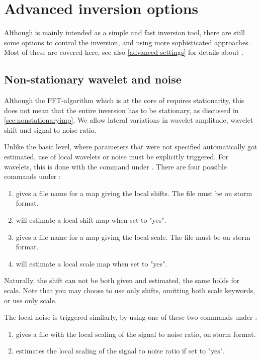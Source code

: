 \section{Advanced inversion options}
\label{sec:advinvusr}
Although \crava is mainly intended as a simple and fast inversion tool, there are still some options to control the inversion, and using more sophisticated approaches. Most of these are covered here, see also \autoref{advanced-settings} for details about .
\subsection{Non-stationary wavelet and noise}
Although the FFT-algorithm which is at the core of \crava requires stationarity, this does not mean that the entire inversion has to be stationary, as discussed in \autoref{sec:nonstationaryimp}. We allow lateral variations in wavelet amplitude, wavelet shift and signal to noise ratio.

Unlike the basic level, where parameters that were not specified automatically got estimated, use of local wavelets or noise must be explicitly triggered. For wavelets, this is done with the  command under . There are four possible commands under :
\begin{enumerate}
\item {} gives a file name for a map giving the local shifts. The file must be on storm format.
\item {} will estimate a local shift map when set to "yes".
\item {} gives a file name for a map giving the local scale. The file must be on storm format.
\item {} will estimate a local scale map when set to "yes".
\end{enumerate}
Naturally, the shift can not be both given and estimated, the same holds for scale. Note that you may choose to use only shifts, omitting both scale keywords, or use only scale.

The local noise is triggered similarly, by using one of these two commands under :
\begin{enumerate}
\item {} gives a file with the local scaling of the signal to noise ratio, on storm format.
\item {} estimates the local scaling of the signal to noise ratio if set to "yes".
\end{enumerate}

